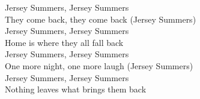 \begin{lyrics}
Jersey Summers, Jersey Summers\\
They come back, they come back (Jersey Summers)\\
Jersey Summers, Jersey Summers\\
Home is where they all fall back\\
Jersey Summers, Jersey Summers\\
One more night, one more laugh (Jersey Summers)\\
Jersey Summers, Jersey Summers\\
Nothing leaves what brings them back
\end{lyrics}

